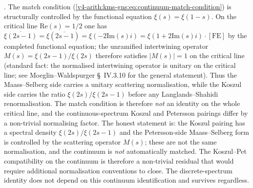 \begin{remark}
\label{v4-arith:kms-gns:rem:match-is-FE}
\ClaimStatusProvedHere. The match condition
(\ref{v4-arith:kms-gns:eq:continuum-match-condition}) is structurally
controlled by the functional equation \(\xi(s)=\xi(1-s)\). On the
critical line \(\mathrm{Re}(s)=1/2\) one has
\(\overline{\xi(2s-1)}=\xi(\overline{2s-1})=\xi(-2\mathrm{Im}(s)i)=\xi(1+2\mathrm{Im}(s)i)\cdot[\text{FE}]\)
by the completed functional equation; the unramified intertwining
operator \(M(s)=\xi(2s-1)/\xi(2s)\) therefore satisfies
\(|M(s)|=1\) on the critical line (standard fact: the normalised
intertwining operator is unitary on the critical line; see
Moeglin--Waldspurger \S~IV.3.10 for the general statement).
Thus the Maass--Selberg side carries a unitary scattering
normalisation, while the Koszul side carries the ratio
\(\xi(2s)/\xi(2s-1)\) before any Langlands--Shahidi renormalisation.
The match condition is therefore \emph{not} an identity on the whole
critical line, and the continuous-spectrum Koszul and Petersson
pairings differ by a non-trivial normalising factor. The honest
statement is: the Koszul pairing has a spectral density
\(\xi(2s)/\xi(2s-1)\) and the Petersson-side Maass--Selberg form is
controlled by the scattering operator \(M(s)\); these are not the same
normalisation, and the continuum is \emph{not} automatically matched. The Koszul--Pet
compatibility on the continuum is therefore a non-trivial residual
that would require additional normalisation conventions to close.
The discrete-spectrum identity
does not depend on this continuum identification and survives
regardless.
\end{remark}

